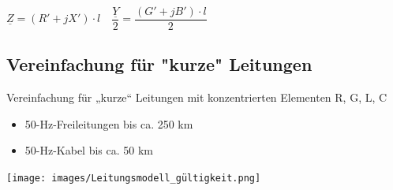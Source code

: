 $
\boxed{
    \underline{Z} = (R' + jX') \cdot l
}
\quad
\boxed{
    \dfrac{\underline{Y}}{2} = \dfrac{(G' + jB') \cdot l}{2}
}
$


\subsection{Vereinfachung für "kurze" Leitungen}

Vereinfachung für „kurze“ Leitungen mit konzentrierten Elementen R, G, L, C
\begin{itemize}
    \item 50-Hz-Freileitungen bis ca. 250 km
    \item 50-Hz-Kabel bis ca. 50 km
\end{itemize}

\vspace{0.15cm}

\texttt{[image: images/Leitungsmodell\_gültigkeit.png]}

\vspace{0.15cm}




























